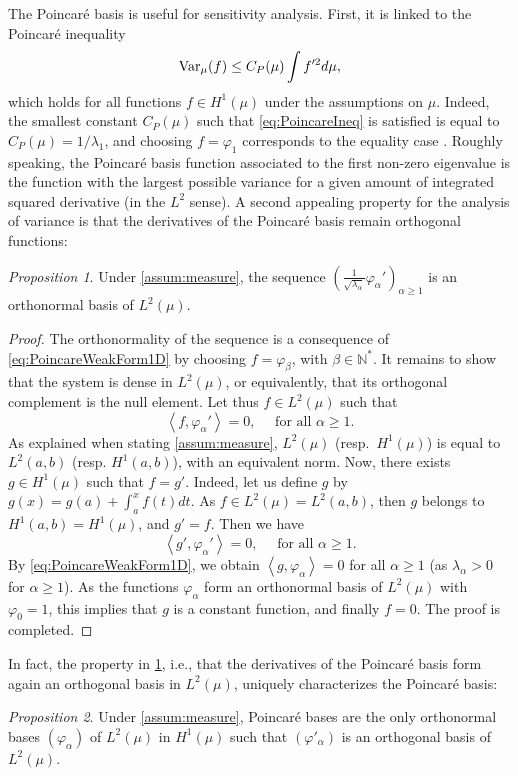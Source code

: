 \documentclass[a4paper,11pt]{article}
\newcommand{\Nn}{\mathbb{N}}
\newcommand{\Var}{{\rm Var}}
\newcommand{\innprod}[2]{\left\langle #1, #2 \right\rangle}
\renewcommand{\citep}[2][]{\cite[#1]{#2}}
\theoremstyle{definition}
\theoremstyle{remark}
\theoremstyle{theorem}
\newtheorem{prop}{Proposition}
\begin{document}
The Poincar\'e basis is useful for sensitivity analysis. First, it is linked to the Poincar\'e inequality
\begin{equation} \label{eq:PoincareIneq}
\Var_{\mu}(f) \leq C_P(\mu) \int f'^2 d\mu,
\end{equation}
which holds for all functions $f \in H^1(\mu)$ under the assumptions on $\mu$. Indeed, the smallest constant $C_P(\mu)$ such that \eqref{eq:PoincareIneq} is satisfied is equal to $C_P(\mu) = 1/\lambda_1$, and choosing $f = \varphi_1$ corresponds to the equality case \citep{roubar17}. Roughly speaking, the Poincar\'e basis function associated to the first non-zero eigenvalue is the function with the largest possible variance for a given amount of integrated squared derivative (in the $L^2$ sense). 
A second appealing property for the analysis of variance is that the derivatives of the Poincar\'e basis remain orthogonal functions:
\begin{prop} \label{prop:PoincDerOrtho1D}
	Under \cref{assum:measure}, the sequence $\left( \frac{1}{\sqrt{\lambda_\alpha}} \varphi_\alpha' \right)_{\alpha \geq 1}$ is an orthonormal basis of $L^2(\mu).$ 
\end{prop}
\begin{proof}
	The orthonormality of the sequence is a consequence of \eqref{eq:PoincareWeakForm1D} by choosing $f = \varphi_{\beta}$, with $\beta \in \Nn^*.$
	It remains to show that the system is dense in $L^2(\mu)$, or equivalently, that its orthogonal complement is the null element. Let thus $f \in L^2(\mu)$ such that 
	\begin{equation*}
	\innprod{ f}{ \varphi_\alpha' } = 0, \quad \text{ for all } \alpha \geq 1.
	\end{equation*}
	As explained when stating \cref{assum:measure}, $L^2(\mu)$ (resp.\ $H^1(\mu)$) is equal to $L^2(a, b)$ (resp. $H^1(a, b)$), with an equivalent norm. 
	Now, there exists $g \in H^1(\mu)$ such that $f = g'$. 
	Indeed, let us define $g$ by $g(x) = g(a) + \int_{a}^x f(t) dt$.
	As $f \in L^2(\mu) = L^2(a, b)$, then $g$ belongs to $H^1(a, b) = H^1(\mu)$, and $g' = f$.
	Then we have 
	\begin{equation*}
	\innprod{ g'}{ \varphi_\alpha' } = 0, \quad \text{ for all } \alpha \geq 1.
	\end{equation*}
	By \eqref{eq:PoincareWeakForm1D}, we obtain $\innprod{ g}{ \varphi_\alpha } = 0$ for all $\alpha \geq 1$ (as $\lambda_\alpha > 0$ for $\alpha \geq 1$).
	As the functions $\varphi_\alpha$ form an orthonormal basis of $L^2(\mu)$ with $\varphi_{0} = 1$, this implies that $g$ is a constant function, and finally $f=0$. The proof is completed.
\end{proof}
In fact, the property in \cref{prop:PoincDerOrtho1D}, i.e., that the derivatives of the Poincar\'e basis form again an orthogonal basis in $L^2(\mu)$, uniquely characterizes the Poincar\'e basis: 
\begin{prop} \label{prop:PoincareBasesCaracterisation}
	Under \cref{assum:measure}, Poincar\'e bases are the only orthonormal bases $(\varphi_\alpha)$ of $L^2(\mu)$ in $H^1(\mu)$ such that $(\varphi'_\alpha)$ is an orthogonal basis of $L^2(\mu)$.
\end{prop}
\end{document}
